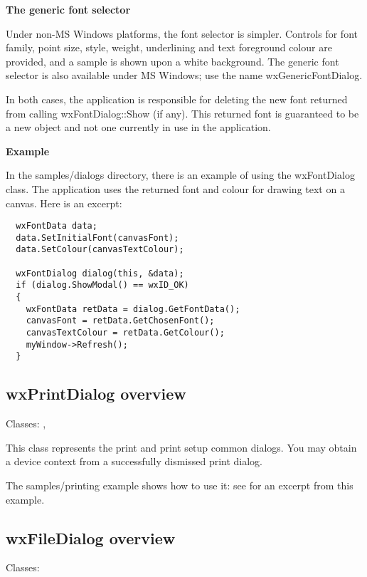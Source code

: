 {\bf The generic font selector}

Under non-MS Windows platforms, the font selector is simpler.
Controls for font family, point size, style, weight,
underlining and text foreground colour are provided, and
a sample is shown upon a white background. The generic font selector
is also available under MS Windows; use the name wxGenericFontDialog.

In both cases, the application is responsible for deleting the
new font returned from calling wxFontDialog::Show (if any).
This returned font is guaranteed to be a new object and not
one currently in use in the application.

{\bf Example}

In the samples/dialogs directory, there is an example of using
the wxFontDialog class. The application uses the returned font
and colour for drawing text on a canvas. Here is an excerpt:

\begin{verbatim}
  wxFontData data;
  data.SetInitialFont(canvasFont);
  data.SetColour(canvasTextColour);
      
  wxFontDialog dialog(this, &data);
  if (dialog.ShowModal() == wxID_OK)
  {
    wxFontData retData = dialog.GetFontData();
    canvasFont = retData.GetChosenFont();
    canvasTextColour = retData.GetColour();
    myWindow->Refresh();
  }
\end{verbatim}

\subsection{wxPrintDialog overview}\label{wxprintdialogoverview}

Classes: , 

This class represents the print and print setup common dialogs.
You may obtain a  device context from
a successfully dismissed print dialog.

The samples/printing example shows how to use it: see  for
an excerpt from this example.

\subsection{wxFileDialog overview}\label{wxfiledialogoverview}

Classes: 

